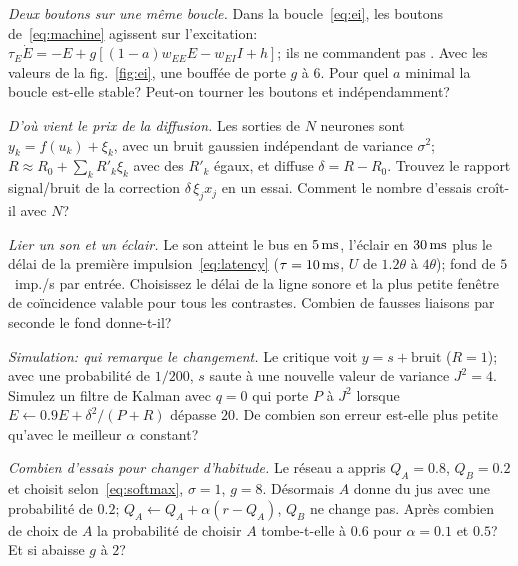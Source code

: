 \begin{exercise}[\lvlB]
\label{ex:10:2}
\emph{Deux boutons sur une même boucle.} Dans la boucle~\eqref{eq:ei}, les boutons de~\eqref{eq:machine} agissent sur l'excitation: $\tau_E\dot E=-E+g[(1-a)w_{EE}E-w_{EI}I+h]$; ils ne commandent pas . Avec les valeurs de la fig.~\ref{fig:ei}, une bouffée de  porte $g$ à $6$. Pour quel $a$ minimal la boucle est-elle stable? Peut-on tourner les boutons  et  indépendamment?
\end{exercise}

\begin{exercise}[\lvlB]
\label{ex:10:3}
\emph{D'où vient le prix de la diffusion.} Les sorties de $N$ neurones sont $y_k=f(u_k)+\xi_k$, avec un bruit gaussien indépendant de variance $\sigma^2$; $R\approx R_0+\sum_kR'_k\xi_k$ avec des $R'_k$ égaux, et  diffuse $\delta=R-R_0$. Trouvez le rapport signal/bruit de la correction $\delta\,\xi_jx_j$ en un essai. Comment le nombre d'essais croît-il avec $N$?
\end{exercise}

\begin{exercise}[\lvlB]
\label{ex:10:4}
\emph{Lier un son et un éclair.} Le son atteint le bus en $5\,\text{ms}$, l'éclair en $30\,\text{ms}$ plus le délai de la première impulsion~\eqref{eq:latency} ($\tau=10\,\text{ms}$, $U$ de $1.2\theta$ à $4\theta$); fond de $5$~imp./s par entrée. Choisissez le délai de la ligne sonore et la plus petite fenêtre de coïncidence valable pour tous les contrastes. Combien de fausses liaisons par seconde le fond donne-t-il?
\end{exercise}

\begin{exercise}[\lvlB]
\label{ex:10:5}
\emph{Simulation: qui remarque le changement.} Le critique voit $y=s+\text{bruit}$ ($R=1$); avec une probabilité de $1/200$, $s$ saute à une nouvelle valeur de variance $J^2=4$. Simulez un filtre de Kalman avec $q=0$ qui porte $P$ à $J^2$ lorsque $E\leftarrow0.9E+\delta^2/(P+R)$ dépasse $20$. De combien son erreur est-elle plus petite qu'avec le meilleur $\alpha$ constant?
\end{exercise}

\begin{exercise}[\lvlA]
\label{ex:10:6}
\emph{Combien d'essais pour changer d'habitude.} Le réseau a appris $Q_A=0.8$, $Q_B=0.2$ et choisit selon~\eqref{eq:softmax}, $\sigma=1$, $g=8$. Désormais $A$ donne du jus avec une probabilité de $0.2$; $Q_A\leftarrow Q_A+\alpha(r-Q_A)$, $Q_B$ ne change pas. Après combien de choix de $A$ la probabilité de choisir $A$ tombe-t-elle à $0.6$ pour $\alpha=0.1$ et $0.5$? Et si  abaisse $g$ à $2$?
\end{exercise}

